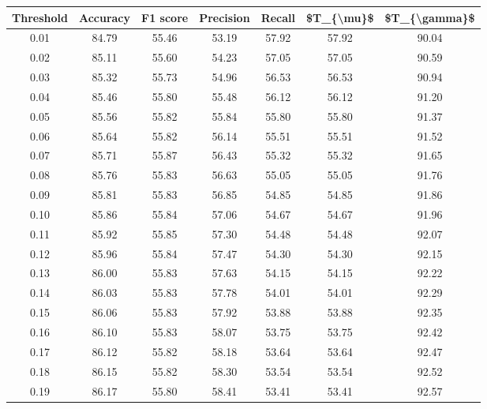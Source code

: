 \begin{tabular}{|c|c|c|c|c|c|c|}
\hline
 Threshold &  Accuracy &  F1 score &  Precision &  Recall &  \$T\_\{\textbackslash mu\}\$ &  \$T\_\{\textbackslash gamma\}\$ \\
\hline
      0.01 &     84.79 &     55.46 &      53.19 &   57.92 &      57.92 &         90.04 \\
      0.02 &     85.11 &     55.60 &      54.23 &   57.05 &      57.05 &         90.59 \\
      0.03 &     85.32 &     55.73 &      54.96 &   56.53 &      56.53 &         90.94 \\
      0.04 &     85.46 &     55.80 &      55.48 &   56.12 &      56.12 &         91.20 \\
      0.05 &     85.56 &     55.82 &      55.84 &   55.80 &      55.80 &         91.37 \\
      0.06 &     85.64 &     55.82 &      56.14 &   55.51 &      55.51 &         91.52 \\
      0.07 &     85.71 &     55.87 &      56.43 &   55.32 &      55.32 &         91.65 \\
      0.08 &     85.76 &     55.83 &      56.63 &   55.05 &      55.05 &         91.76 \\
      0.09 &     85.81 &     55.83 &      56.85 &   54.85 &      54.85 &         91.86 \\
      0.10 &     85.86 &     55.84 &      57.06 &   54.67 &      54.67 &         91.96 \\
      0.11 &     85.92 &     55.85 &      57.30 &   54.48 &      54.48 &         92.07 \\
      0.12 &     85.96 &     55.84 &      57.47 &   54.30 &      54.30 &         92.15 \\
      0.13 &     86.00 &     55.83 &      57.63 &   54.15 &      54.15 &         92.22 \\
      0.14 &     86.03 &     55.83 &      57.78 &   54.01 &      54.01 &         92.29 \\
      0.15 &     86.06 &     55.83 &      57.92 &   53.88 &      53.88 &         92.35 \\
      0.16 &     86.10 &     55.83 &      58.07 &   53.75 &      53.75 &         92.42 \\
      0.17 &     86.12 &     55.82 &      58.18 &   53.64 &      53.64 &         92.47 \\
      0.18 &     86.15 &     55.82 &      58.30 &   53.54 &      53.54 &         92.52 \\
      0.19 &     86.17 &     55.80 &      58.41 &   53.41 &      53.41 &         92.57 \\

\end{tabular}
